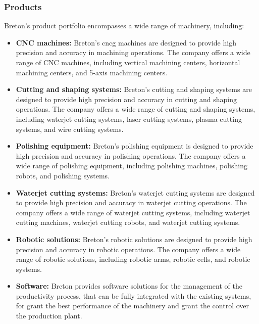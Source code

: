 \subsubsection{Products}
Breton's product portfolio encompasses a wide range of machinery, including:
\begin{itemize}
    \item \textbf{CNC machines:} Breton's \gls{cncg} machines are designed to provide high precision and accuracy in machining operations. The company offers a wide range of CNC machines, including vertical machining centers, horizontal machining centers, and 5-axis machining centers.
    \item \textbf{Cutting and shaping systems:} Breton's cutting and shaping systems are designed to provide high precision and accuracy in cutting and shaping operations. The company offers a wide range of cutting and shaping systems, including waterjet cutting systems, laser cutting systems, plasma cutting systems, and wire cutting systems.
    \item \textbf{Polishing equipment:} Breton's polishing equipment is designed to provide high precision and accuracy in polishing operations. The company offers a wide range of polishing equipment, including polishing machines, polishing robots, and polishing systems.
    \item \textbf{Waterjet cutting systems:} Breton's waterjet cutting systems are designed to provide high precision and accuracy in waterjet cutting operations. The company offers a wide range of waterjet cutting systems, including waterjet cutting machines, waterjet cutting robots, and waterjet cutting systems.
    \item \textbf{Robotic solutions:} Breton's robotic solutions are designed to provide high precision and accuracy in robotic operations. The company offers a wide range of robotic solutions, including robotic arms, robotic cells, and robotic systems.
    \item \textbf{Software:} Breton provides software solutions for the management of the productivity process, that can be fully integrated with the existing systems, for grant the best performance of the machinery and grant the control over the production plant.
\end{itemize} 

